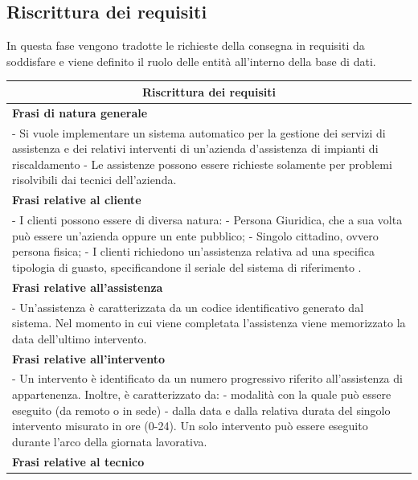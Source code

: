 \documentclass[legalpaper]{article}
\begin{document}
\subsection{Riscrittura dei requisiti}
In questa fase vengono tradotte le richieste della consegna in requisiti da soddisfare e viene definito il ruolo delle entità all’interno della base di dati.
\newline

\begin{tabular}{ |p{16 cm}| }
\hline
\multicolumn{1}{|c|}{\textbf{Riscrittura dei requisiti}} \\
\hline
\textbf{Frasi di natura generale}  \\
\hline
- Si vuole implementare un sistema automatico per la gestione dei servizi di assistenza e dei relativi interventi di un'azienda d'assistenza di impianti di riscaldamento \newline
- Le assistenze possono essere richieste solamente per problemi risolvibili dai tecnici dell'azienda.\\ \hline
\textbf{Frasi relative al cliente}  \\
\hline
-  I clienti possono essere di diversa natura:
- Persona Giuridica, che a sua volta può essere un'azienda oppure un ente pubblico; \newline
- Singolo cittadino, ovvero persona fisica; \newline
- I clienti richiedono un'assistenza relativa ad una specifica tipologia di guasto, specificandone il seriale del sistema di riferimento .\\
\hline
\textbf{Frasi relative all'assistenza}  \\
\hline
- Un'assistenza è caratterizzata da un codice identificativo generato dal sistema. Nel momento in cui viene completata l'assistenza viene memorizzato la data dell'ultimo intervento.\\
\hline
\textbf{Frasi relative all'intervento}  \\
\hline
- Un intervento è identificato da un numero progressivo riferito all'assistenza di appartenenza. Inoltre, è caratterizzato da: \newline
- modalità con la quale può essere eseguito (da remoto o in sede)\newline
- dalla data e dalla relativa durata del singolo intervento misurato in ore (0-24). \newline 
Un solo intervento può essere eseguito durante l'arco della giornata lavorativa.\\
\hline
\textbf{Frasi relative al tecnico}  \\

\end{tabular}
\end{document}
